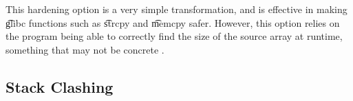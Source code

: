 This hardening option is a very simple transformation, and is effective in making \t{glibc} functions such as \t{strcpy} and \t{memcpy} safer.
However, this option relies on the program being able to correctly find the size of the source array at runtime, something that may not be concrete \citep{struct-hack}. 


\subsection{Stack Clashing}




